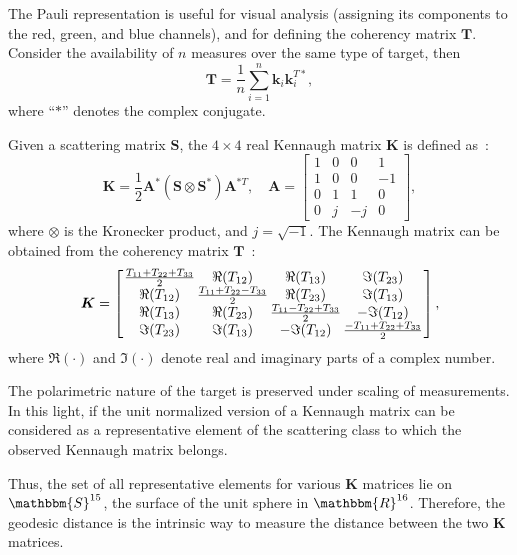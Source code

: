 \documentclass[journal]{IEEEtran}
\begin{document}
	The Pauli representation is useful for visual analysis (assigning its components to the red, green, and blue channels), and for defining the coherency matrix $\bm T$.
	Consider the availability of $n$ measures over the same type of target, then
	$$
	\bm T = \frac{1}{n} \sum_{i=1}^{n}\bm k_i \bm k_i^{T*},
	$$
	where ``$*$'' denotes the complex conjugate.
	
	Given a scattering matrix $\bm{S}$, the $4 \times 4$ real Kennaugh matrix $\bm{K}$ is defined as~\cite{Pottier09}:
	\begin{equation}
	\bm{K} = \frac{1}{2}\bm{A}^*(\bm{S} \otimes \bm{S}^*) \bm{A}^{*T}, \quad \bm{A} = \left[
	\begin{array}{cccc}
	1 & 0 & 0 & 1\\
	1 & 0 & 0 & -1\\
	0 & 1 & 1 & 0\\
	0 & j & -j & 0
	\end{array}\right],
	\end{equation}
	where $\otimes$ is the Kronecker product, and  $j = \sqrt{-1}$.
	The Kennaugh matrix can be obtained from the coherency matrix $\bm{T}$~\cite{PolarisationApplicationsRemoteSensing}:
	\begin{equation}
	\label{incoKen}
	\bm{K} =
	\left[\arraycolsep=.7pt
	\begin{array}{cccc}
	\frac{T_{11}+T_{22}+ T_{33}}{2} & \Re(T_{12}) & \Re(T_{13}) & \Im(T_{23})\\
	\Re(T_{12}) & \frac{T_{11}+T_{22}-T_{33}}{2} & \Re(T_{23}) & \Im(T_{13})\\
	\Re(T_{13}) & \Re(T_{23}) & \frac{T_{11}-T_{22}+T_{33}}{2} & - \Im(T_{12})\\
	\Im(T_{23}) & \Im(T_{13}) & - \Im(T_{12}) &\frac{-T_{11}+T_{22}+T_{33}}{2}
	\end{array}\right],
	\end{equation}
	where $\Re(\cdot)$ and $\Im(\cdot)$ denote real and imaginary parts of a complex number. 
	
	The polarimetric nature of the target is preserved under scaling of measurements. In this light, if the unit normalized version of a Kennaugh matrix can be considered as a representative element of the scattering class to which the observed Kennaugh matrix belongs.%
	
	Thus, the set of all representative elements for various $\bm{K}$ matrices lie on $\mathbbm{S}^{15}$, the surface of the unit sphere in $\mathbbm{R}^{16}$. 
	Therefore, the geodesic distance is the intrinsic way to measure the distance between the two $\bm{K}$ matrices.
	
\end{document}
